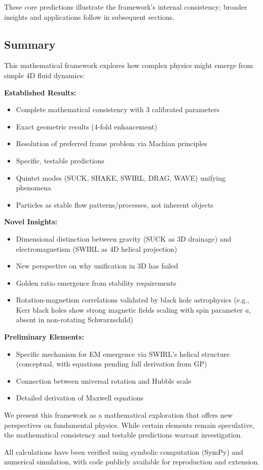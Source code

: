 These core predictions illustrate the framework's internal consistency; broader insights and applications follow in subsequent sections.

\subsection{Summary}

This mathematical framework explores how complex physics might emerge from simple 4D fluid dynamics:

\textbf{Established Results:}
\begin{itemize}
\item Complete mathematical consistency with 3 calibrated parameters
\item Exact geometric results (4-fold enhancement)
\item Resolution of preferred frame problem via Machian principles
\item Specific, testable predictions
\item Quintet modes (SUCK, SHAKE, SWIRL, DRAG, WAVE) unifying phenomena
\item Particles as stable flow patterns/processes, not inherent objects
\end{itemize}

\textbf{Novel Insights:}
\begin{itemize}
\item Dimensional distinction between gravity (SUCK as 3D drainage) and electromagnetism (SWIRL as 4D helical projection)
\item New perspective on why unification in 3D has failed
\item Golden ratio emergence from stability requirements
\item Rotation-magnetism correlations validated by black hole astrophysics (e.g., Kerr black holes show strong magnetic fields scaling with spin parameter $a$, absent in non-rotating Schwarzschild)
\end{itemize}

\textbf{Preliminary Elements:}
\begin{itemize}
\item Specific mechanism for EM emergence via SWIRL's helical structure (conceptual, with equations pending full derivation from GP)
\item Connection between universal rotation and Hubble scale
\item Detailed derivation of Maxwell equations
\end{itemize}

We present this framework as a mathematical exploration that offers new perspectives on fundamental physics. While certain elements remain speculative, the mathematical consistency and testable predictions warrant investigation.

All calculations have been verified using symbolic computation (SymPy) and numerical simulation, with code publicly available for reproduction and extension.

